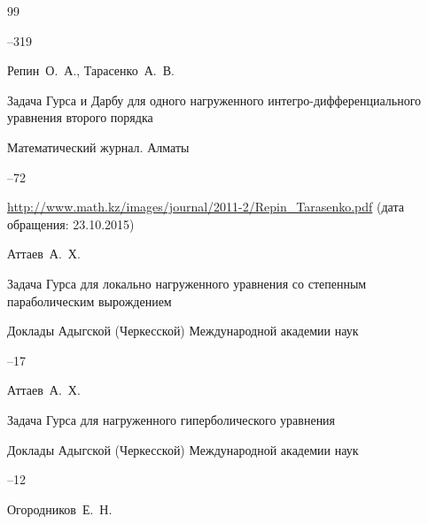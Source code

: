 \begin{thebibliography}{99}

--319






\by Репин~О.~А., Тарасенко~А.~В.

\paper Задача Гурса и Дарбу для одного нагруженного интегро-дифференциального уравнения второго порядка

\jour Математический журнал. Алматы




--72

\elink \url{http://www.math.kz/images/journal/2011-2/Repin_Tarasenko.pdf} (дата обращения: 23.10.2015)

\mathscinet{}




\by Аттаев~А.~Х.

\paper Задача Гурса для локально нагруженного уравнения со степенным параболическим вырождением

\jour Доклады Адыгской (Черкесской) Международной академии наук




--17





\by Аттаев~А.~Х.

\paper Задача Гурса для нагруженного гиперболического уравнения

\jour Доклады Адыгской (Черкесской) Международной академии наук




--12





\by Огородников~Е.~Н.


\end{thebibliography}
